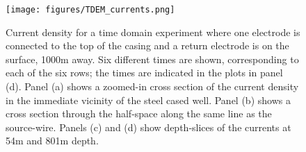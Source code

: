 \begin{figure}
    \begin{center}
    \texttt{[image: figures/TDEM\_currents.png]}
    \end{center}
\caption{
    Current density for a time domain experiment where one electrode is connected to the top of the casing and a return electrode is on the surface, 1000m away.
    Six different times are shown, corresponding to each of the six rows; the times are indicated in the plots in panel (d).
    Panel (a) shows a zoomed-in cross section of the current density in the immediate vicinity of the steel cased well.
    Panel (b) shows a cross section through the half-space along the same line as the source-wire.
    Panels (c) and (d) show depth-slices of the currents at 54m and 801m depth.
}
\label{fig:TDEM_currents}
\end{figure}
